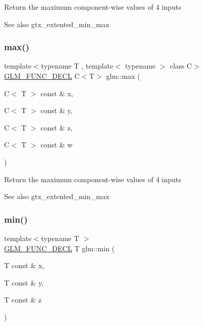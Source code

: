 Return the maximum component-\/wise values of 4 inputs \begin{DoxySeeAlso}{See also}
gtx\+\_\+extented\+\_\+min\+\_\+max 
\end{DoxySeeAlso}
\mbox{\label{group__gtx__extended__min__max_gaacffbc466c2d08c140b181e7fd8a4858}} 
\subsubsection{\texorpdfstring{max()}{max()}\hspace{0.1cm}{\footnotesize\ttfamily [6/6]}}
{\footnotesize\ttfamily template$<$typename T , template$<$ typename $>$ class C$>$ \\
\hyperlink{setup_8hpp_ab2d052de21a70539923e9bcbf6e83a51}{G\+L\+M\+\_\+\+F\+U\+N\+C\+\_\+\+D\+E\+CL} C$<$T$>$ glm\+::max (\begin{DoxyParamCaption}\item[{C$<$ T $>$ const \&}]{x,  }\item[{C$<$ T $>$ const \&}]{y,  }\item[{C$<$ T $>$ const \&}]{z,  }\item[{C$<$ T $>$ const \&}]{w }\end{DoxyParamCaption})}

Return the maximum component-\/wise values of 4 inputs \begin{DoxySeeAlso}{See also}
gtx\+\_\+extented\+\_\+min\+\_\+max 
\end{DoxySeeAlso}
\mbox{\label{group__gtx__extended__min__max_ga713d3f9b3e76312c0d314e0c8611a6a6}} 
\subsubsection{\texorpdfstring{min()}{min()}\hspace{0.1cm}{\footnotesize\ttfamily [1/6]}}
{\footnotesize\ttfamily template$<$typename T $>$ \\
\hyperlink{setup_8hpp_ab2d052de21a70539923e9bcbf6e83a51}{G\+L\+M\+\_\+\+F\+U\+N\+C\+\_\+\+D\+E\+CL} T glm\+::min (\begin{DoxyParamCaption}\item[{T const \&}]{x,  }\item[{T const \&}]{y,  }\item[{T const \&}]{z }\end{DoxyParamCaption})}


